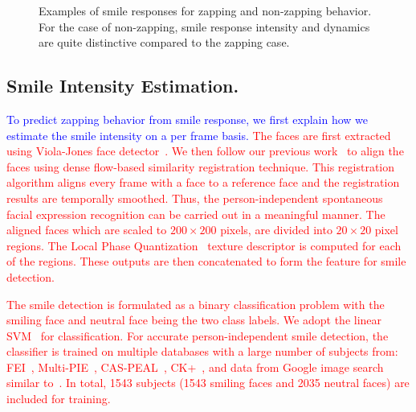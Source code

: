 \documentclass[twoside,leqno,twocolumn]{article}
\newcommand{\Songfan}[1]{\textcolor{red}{#1}}
\newcommand{\SFAdd}[1]{\textcolor{blue}{#1}}
\begin{document}
\begin{figure}[t] 
\centering
\caption{Examples of smile responses for zapping and non-zapping behavior. For the case of non-zapping, smile response intensity and dynamics are quite distinctive compared to the zapping case.}
\label{fig:smile_ex}
\end{figure}

\subsection{Smile Intensity Estimation.}

\SFAdd{To predict zapping behavior from smile response, we first explain how we estimate the smile intensity on a per frame basis.} \Songfan{The faces are first extracted using Viola-Jones face detector~\cite{Viola_IJCV04}. We then follow our previous work~\cite{Yang13} to align the faces using dense flow-based similarity registration technique. This registration algorithm aligns every frame with a face to a reference face and the registration results are temporally smoothed. Thus, the person-independent spontaneous facial expression recognition can be carried out in a meaningful manner. The aligned faces which are scaled to $200\times200$ pixels, are divided into $20\times20$ pixel regions. The Local Phase Quantization~\cite{Ojansivu_ICISP08} texture descriptor is computed for each of the regions. These outputs are then concatenated to form the feature for smile detection.}

\Songfan{The smile detection is formulated as a binary classification problem with the smiling face and neutral face being the two class labels. We adopt the linear SVM~\cite{SVMlib} for classification. For accurate person-independent smile detection, the classifier is trained on multiple databases with a large number of subjects from: FEI~\cite{FEI}, Multi-PIE~\cite{MPIE}, CAS-PEAL~\cite{CAS}, CK+~\cite{CKplus}, and data from Google image search similar to~\cite{Le14}. In total, 1543 subjects (1543 smiling faces and 2035 neutral faces) are included for training. }
\end{document}
